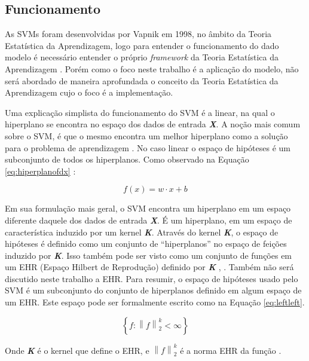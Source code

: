  \subsection{Funcionamento}

As SVMs foram desenvolvidas por Vapnik em 1998, no âmbito da Teoria Estatística da Aprendizagem, logo para entender o funcionamento do dado modelo é necessário entender o próprio \textit{framework} da Teoria Estatística da Aprendizagem \cite{vapnik1998statistical}. Porém como o foco neste trabalho é a aplicação do modelo, não será abordado de maneira aprofundada o conceito da Teoria Estatística da Aprendizagem cujo o foco é a implementação.
 
Uma explicação simplista do funcionamento do SVM é a linear, na qual o hiperplano se encontra no espaço dos dados de entrada \textbf{\textit{X}}. A noção mais comum sobre o SVM, é que o mesmo encontra um melhor hiperplano como a solução para o problema de aprendizagem \cite{vapnik1998statistical}. No caso linear o espaço de hipóteses é um subconjunto de todos os hiperplanos. Como observado na Equação \ref{eq:hiperplanofdx} \cite{evgeniou1999support}:

\begin{equation} \label{eq:hiperplanofdx}
    f(x)= w\cdot x +b
\end{equation}

Em sua formulação mais geral, o SVM encontra um hiperplano em um espaço diferente daquele dos dados de entrada \textbf{\textit{X}}. É um hiperplano, em um espaço de característica induzido por um kernel \textbf{\textit{K}}. Através do kernel \textbf{\textit{K}}, o espaço de hipóteses é definido como um conjunto de  “hiperplanos” no espaço de feições induzido por \textbf{\textit{K}}. Isso também pode ser visto como um conjunto de funções em um EHR (Espaço Hilbert de Reprodução) definido por \textbf{\textit{K}} \cite{wahba1990spline}, \cite{vapnik1998statistical}. Também não será discutido neste trabalho a EHR. Para resumir, o espaço de hipóteses usado pelo SVM é um subconjunto do conjunto de hiperplanos definido em algum espaço de um EHR. Este espaço pode ser formalmente escrito como na Equação \ref{eq:leftleft}.

\begin{equation} \label{eq:leftleft}
    \left \{ f:\left \| f \right \|_{2}^{k} < \infty \right \}
\end{equation}

Onde \textbf{\textit{K}} é o kernel que define o EHR, e $ \left \| f \right \|_{2}^{k} $  é a norma EHR da função \cite{wahba1990spline}. 

